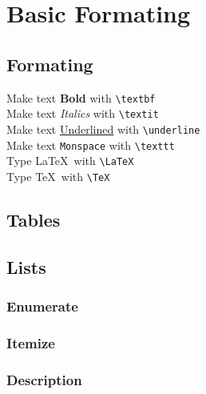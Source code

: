 \section{Basic Formating}
\subsection{Formating}
Make text \textbf{Bold} with \texttt{\textbackslash textbf}
\bigskip\\
Make text \textit{Italics} with \texttt{\textbackslash textit}
\bigskip\\
Make text \underline{Underlined} with \texttt{\textbackslash underline}
\bigskip\\
Make text \texttt{Monspace} with \texttt{\textbackslash texttt}
\bigskip\\
Type \LaTeX\ with \texttt{\textbackslash LaTeX}\\
Type \TeX\ with \texttt{\textbackslash TeX}

\subsection{Tables}

\subsection{Lists}

\subsubsection{Enumerate}

\subsubsection{Itemize}

\subsubsection{Description}
